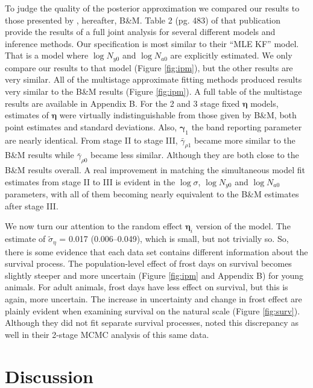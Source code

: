 \documentclass[12pt]{article}
\newcommand{\bn}{\boldsymbol{\eta}}
\newcommand{\bg}{\boldsymbol{\gamma}}
\begin{document}
To judge the quality of the posterior approximation we compared our results to those presented by \citet{besbeas2019exact}, hereafter, B\&M. Table 2 (pg. 483) of that publication provide the results of a full joint analysis for several different models and inference methods. Our specification is most similar to their ``MLE KF'' model. That is a model where $\log N_{y0}$ and $\log N_{a0}$ are explicitly estimated.  We only compare our results to that model (Figure \ref{fig:ipm}), but the other results are very similar. All of the multistage approximate fitting methods produced results very similar to  the B\&M results (Figure \ref{fig:ipm}). A full table of the multistage results are available in Appendix B. For the 2 and 3 stage fixed $\bn$ models, estimates of $\bn$ were virtually indistinguishable from those given by B\&M, both point estimates and standard deviations. Also, $\bg_1$ the band reporting parameter are nearly identical. From stage II to stage III, $\bar{\gamma}_{\rho 1}$ became more similar to the B\&M results while $\bar{\gamma}_{\rho 0}$ became less similar. Although they are both close to the B\&M results overall. A real improvement in matching the simultaneous model fit estimates from stage II to III is evident in the $\log \sigma$, $\log N_{y0}$ and $\log N_{a0}$ parameters, with all of them becoming nearly equivalent to the B\&M estimates after stage III.  

We now turn our attention to the random effect $\bn_i$ version of the model. The estimate of $\tilde{\sigma}_\eta$ = 0.017 (0.006--0.049), which is small, but not trivially so. So, there is some evidence that each data set contains different information about the survival process. The population-level effect of frost days on survival becomes slightly steeper and more uncertain (Figure \ref{fig:ipm} and Appendix B) for young animals. For adult animals, frost days have less effect on survival, but this is again, more uncertain. The increase in uncertainty and change in frost effect are plainly evident when examining survival on the natural scale (Figure \ref{fig:surv}). Although they did not fit separate survival processes, \citet{goudie2019joining} noted this discrepancy as well in their 2-stage MCMC analysis of this same data.          


\section{Discussion}
\end{document}
